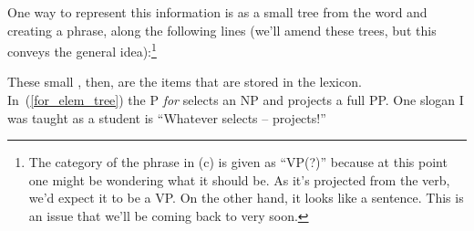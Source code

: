 \documentclass{article}
\begin{document}
One way to represent this information is as a small tree  from the word and creating a phrase, along the following lines (we'll amend these trees, but this conveys the general idea):\footnote{The category of the phrase in (c) is given as ``VP(?)'' because at this point one might be wondering what it should be.
As it's projected from the verb, we'd expect it to be a VP.
On the other hand, it looks like a sentence. This is an issue that we'll be coming back to very soon.}
\begin{exe}
\end{exe}
These small , then, are the items that are stored in the lexicon. In~(\ref{for_elem_tree}) the P \emph{for} selects an NP and projects a full PP. One slogan I was taught as a student is ``Whatever selects -- projects!''
\end{document}
